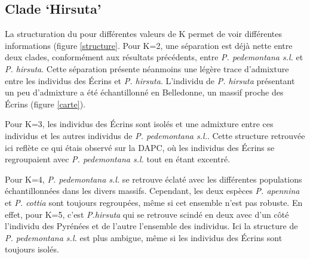\subsection{Clade `Hirsuta'}

La structuration du  pour différentes valeurs de K permet de voir différentes informations (figure \ref{structure}. Pour K=2, une séparation est déjà nette entre deux clades, conformément aux résultats précédents, entre \textit{P. pedemontana s.l.} et \textit{P. hirsuta}. Cette séparation présente néanmoins une légère trace d'admixture entre les individus des Écrins et \textit{P. hirsuta}. L'individu de \textit{P. hirsuta} présentant un peu d'admixture a été échantillonné en Belledonne, un massif proche des Écrins (figure \ref{carte}).

Pour K=3, les individus des Écrins sont isolés et une admixture entre ces individus et les autres individus de \textit{P. pedemontana s.l.}. Cette structure retrouvée ici reflète ce qui étais observé sur la DAPC, où les individus des Écrins se regroupaient avec \textit{P. pedemontana s.l.} tout en étant excentré.

Pour K=4, \textit{P. pedemontana s.l.} se retrouve éclaté avec les différentes populations échantillonnées dans les divers massifs. Cependant, les deux espèces \textit{P. apennina} et \textit{P. cottia} sont toujours regroupées, même si cet ensemble n'est pas robuste. En effet, pour K=5, c'est \textit{P.hirsuta} qui se retrouve scindé en deux avec d'un côté l'individu des Pyrénées et de l'autre l'ensemble des individus. Ici la structure de \textit{P. pedemontana s.l.} est plus ambigue, même si les individus des Écrins sont toujours isolés.

\DIFaddbegin {}
\DIFaddend 

